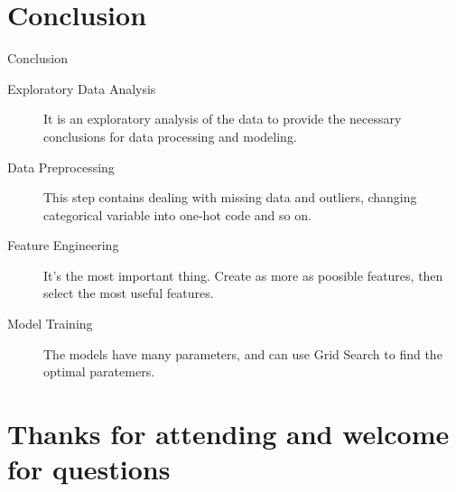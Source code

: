 \documentclass[
size=14pt,
paper=smartboard,  %
mode=present, 		%
display=slides, 	%
pauseslide,
fleqn,leqno]{powerdot}
\begin{document}




\section{Conclusion}

\begin{slide}[toc=,bm=]{Conclusion}
\begin{description}
	\item[Exploratory Data Analysis] It is an 
	exploratory analysis of the data to 
	provide the necessary conclusions 
	for data processing and modeling.
	\item[Data Preprocessing] This step contains
	dealing with missing data and outliers,
	changing categorical variable 
	into one-hot code and so on.
	\item[Feature Engineering] It's the 
	most important thing.
	Create as more as poosible features,
	then select the most useful features.
	\item[Model Training] The models have 
	many parameters,
	and can use Grid Search to find 
	the optimal paratemers.	
\end{description}



\end{slide}


%

\section{Thanks for attending and welcome for questions}


\end{document}
